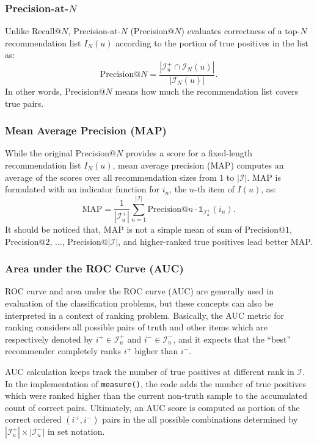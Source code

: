 \subsubsection{Precision-at-$N$}

Unlike Recall@$N$, Precision-at-$N$ (Precision@$N$) evaluates correctness of a top-$N$ recommendation list $I_N(u)$ according to the portion of true positives in the list as:
$$
\mathrm{Precision@}N = \frac{|\mathcal{I}^+_u \cap \mathcal{I}_N(u)|}{|\mathcal{I}_N(u)|}.
$$
In other words, Precision@$N$ means how much the recommendation list covers true pairs.

\subsubsection{Mean Average Precision (MAP)}

While the original Precision@$N$ provides a score for a fixed-length recommendation list $I_N(u)$, mean average precision (MAP) computes an average of the scores over all recommendation sizes from 1 to $|\mathcal{I}|$. MAP is formulated with an indicator function for $i_n$, the $n$-th item of $I(u)$, as:
\begin{equation*}
\mathrm{MAP} = \frac{1}{|\mathcal{I}^+_u|} \sum_{n = 1}^{|\mathcal{I}|} \mathrm{Precision@}n \cdot \mathds{1}_{\mathcal{I}^+_u}(i_n).
\end{equation*}
It should be noticed that, MAP is not a simple mean of sum of Precision@$1$, Precision@$2$, $\dots$, Precision@$|\mathcal{I}|$, and higher-ranked true positives lead better MAP.

\subsubsection{Area under the ROC Curve (AUC)}

ROC curve and area under the ROC curve (AUC) are generally used in evaluation of the classification problems, but these concepts can also be interpreted in a context of ranking problem. Basically, the AUC metric for ranking considers all possible pairs of truth and other items which are respectively denoted by $i^+ \in \mathcal{I}^+_u$ and $i^- \in \mathcal{I}^-_u$, and it expects that the ``best'' recommender completely ranks $i^+$ higher than $i^-$.

AUC calculation keeps track the number of true positives at different rank in $\mathcal{I}$. In the implementation of \texttt{measure()}, the code adds the number of true positives which were ranked higher than the current non-truth sample to the accumulated count of correct pairs. Ultimately, an AUC score is computed as portion of the correct ordered $(i^+, i^-)$ pairs in the all possible combinations determined by $|\mathcal{I}^+_u| \times |\mathcal{I}^-_u|$ in set notation. 


